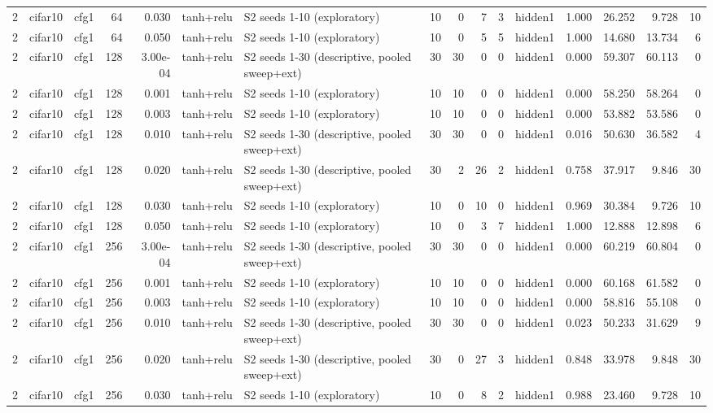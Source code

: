 \begin{table}[htbp]
{\begin{tabular}{@{}rllrrllrrrrlrrrr@{}}
2 & cifar10 & cfg1 & 64 & 0.030 & tanh+relu & S2 seeds 1-10 (exploratory) & 10 & 0 & 7 & 3 & hidden1 & 1.000 & 26.252 & 9.728 & 10 \\
2 & cifar10 & cfg1 & 64 & 0.050 & tanh+relu & S2 seeds 1-10 (exploratory) & 10 & 0 & 5 & 5 & hidden1 & 1.000 & 14.680 & 13.734 & 6 \\
2 & cifar10 & cfg1 & 128 & 3.00e-04 & tanh+relu & S2 seeds 1-30 (descriptive, pooled sweep+ext) & 30 & 30 & 0 & 0 & hidden1 & 0.000 & 59.307 & 60.113 & 0 \\
2 & cifar10 & cfg1 & 128 & 0.001 & tanh+relu & S2 seeds 1-10 (exploratory) & 10 & 10 & 0 & 0 & hidden1 & 0.000 & 58.250 & 58.264 & 0 \\
2 & cifar10 & cfg1 & 128 & 0.003 & tanh+relu & S2 seeds 1-10 (exploratory) & 10 & 10 & 0 & 0 & hidden1 & 0.000 & 53.882 & 53.586 & 0 \\
2 & cifar10 & cfg1 & 128 & 0.010 & tanh+relu & S2 seeds 1-30 (descriptive, pooled sweep+ext) & 30 & 30 & 0 & 0 & hidden1 & 0.016 & 50.630 & 36.582 & 4 \\
2 & cifar10 & cfg1 & 128 & 0.020 & tanh+relu & S2 seeds 1-30 (descriptive, pooled sweep+ext) & 30 & 2 & 26 & 2 & hidden1 & 0.758 & 37.917 & 9.846 & 30 \\
2 & cifar10 & cfg1 & 128 & 0.030 & tanh+relu & S2 seeds 1-10 (exploratory) & 10 & 0 & 10 & 0 & hidden1 & 0.969 & 30.384 & 9.726 & 10 \\
2 & cifar10 & cfg1 & 128 & 0.050 & tanh+relu & S2 seeds 1-10 (exploratory) & 10 & 0 & 3 & 7 & hidden1 & 1.000 & 12.888 & 12.898 & 6 \\
2 & cifar10 & cfg1 & 256 & 3.00e-04 & tanh+relu & S2 seeds 1-30 (descriptive, pooled sweep+ext) & 30 & 30 & 0 & 0 & hidden1 & 0.000 & 60.219 & 60.804 & 0 \\
2 & cifar10 & cfg1 & 256 & 0.001 & tanh+relu & S2 seeds 1-10 (exploratory) & 10 & 10 & 0 & 0 & hidden1 & 0.000 & 60.168 & 61.582 & 0 \\
2 & cifar10 & cfg1 & 256 & 0.003 & tanh+relu & S2 seeds 1-10 (exploratory) & 10 & 10 & 0 & 0 & hidden1 & 0.000 & 58.816 & 55.108 & 0 \\
2 & cifar10 & cfg1 & 256 & 0.010 & tanh+relu & S2 seeds 1-30 (descriptive, pooled sweep+ext) & 30 & 30 & 0 & 0 & hidden1 & 0.023 & 50.233 & 31.629 & 9 \\
2 & cifar10 & cfg1 & 256 & 0.020 & tanh+relu & S2 seeds 1-30 (descriptive, pooled sweep+ext) & 30 & 0 & 27 & 3 & hidden1 & 0.848 & 33.978 & 9.848 & 30 \\
2 & cifar10 & cfg1 & 256 & 0.030 & tanh+relu & S2 seeds 1-10 (exploratory) & 10 & 0 & 8 & 2 & hidden1 & 0.988 & 23.460 & 9.728 & 10 \\

\end{tabular}}
\end{table}
